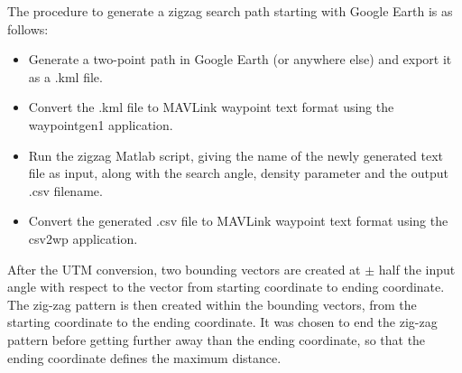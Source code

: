 The procedure to generate a zigzag search path starting with Google Earth is as follows:
\begin{itemize}
\item Generate a two-point path in Google Earth (or anywhere else) and export it as a .kml file.
\item Convert the .kml file to MAVLink waypoint text format using the waypointgen1 application.
\item Run the zigzag Matlab script, giving the name of the newly generated text file as input,
along with the search angle, density parameter and the output .csv filename.
\item Convert the generated .csv file to MAVLink waypoint text format using the csv2wp application.
\end{itemize}
After the UTM conversion, two bounding vectors are created at \(\pm\) half the input angle
with respect to the vector from starting coordinate to ending coordinate.
The zig-zag pattern is then created within the bounding vectors, from the starting coordinate to the
ending coordinate. It was chosen to end the zig-zag pattern before getting further away than the
ending coordinate, so that the ending coordinate defines the maximum distance.

